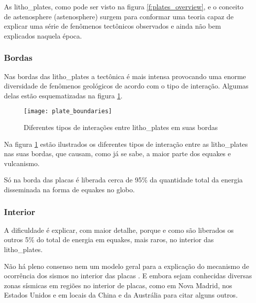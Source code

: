 As \glspl{litho_plate}, como pode ser visto na figura \ref{f:plates_overview},
e o conceito de \gls{astenosphere} (\glsdesc{astenosphere}) 
surgem para conformar uma teoria capaz de explicar
uma série de fenômenos tectônicos observados e ainda não bem explicados naquela época. 


\subsubsection{Bordas}
\label{sec:02_bordas}

Nas bordas das \glspl{litho_plate} a tectônica é mais intensa
provocando uma enorme diversidade de fenômenos geológicos de acordo
com o tipo de interação. Algumas delas estão esquematizadas na 
figura \ref{f:plate_boundaries}.

\begin{figure}[H]
   \centering
   \texttt{[image: plate\_boundaries]}
   \caption[Diferentes tipos de interações entre \glspl{litho_plate} em suas bordas]
   		   {Diferentes tipos de interações entre \glspl{litho_plate} em suas bordas\footnotemark} 
   \label{f:plate_boundaries}
\end{figure} 
 
Na figura \ref{f:plate_boundaries} estão ilustrados os diferentes tipos de interação 
entre as \glspl{litho_plate} nas suas bordas, que causam, como já se sabe, a maior
parte dos \glspl{equake} e vulcanismo.

Só na borda das placas é liberada cerca de 95\% da quantidade total da energia 
disseminada na forma de \glspl{equake} no globo.

\subsubsection{Interior}
\label{sec:02_interior}

A dificuldade é explicar, com maior detalhe, porque e como são liberados os outros 
5\% do total de energia em \glspl{equake}, mais raros, no interior das \glspl{litho_plate}.

Não há pleno consenso nem um modelo geral para a explicação do mecanismo de ocorrência dos
sismos no interior das placas \citep{talwani_2014}. 
E embora sejam conhecidas diversas zonas sísmicas em regiões no
interior de placas, como em Nova Madrid, nos Estados Unidos 
e em locais da China e da Austrália para citar alguns outros.


